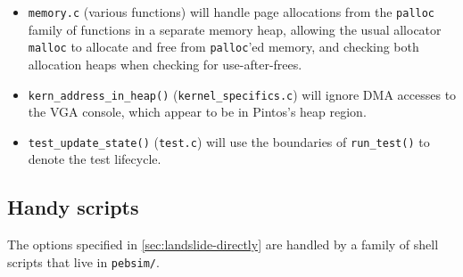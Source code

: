 \begin{itemize}
	\item {\tt memory.c} (various functions)
		will handle page allocations from the {\tt palloc} family of functions in a separate memory heap,
		allowing the usual allocator {\tt malloc} to allocate and free from {\tt palloc}'ed memory,
		and checking both allocation heaps when checking for use-after-frees.
	\item {\tt kern\_address\_in\_heap()} ({\tt kernel\_specifics.c})
		will ignore DMA accesses to the VGA console,
		which appear to be in Pintos's heap region.
	\item {\tt test\_update\_state()} ({\tt test.c})
		will use the boundaries of {\tt run\_test()} to denote the test lifecycle.
\end{itemize}


\subsection{Handy scripts}
\label{sec:landslide-glue}

The options specified in \cref{sec:landslide-directly}
are handled by a family of  shell scripts that live in {\tt pebsim/}.

